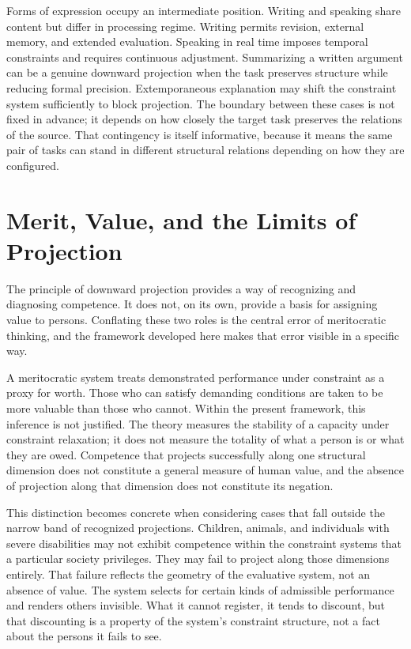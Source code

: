 \documentclass[12pt, a4paper]{article}
\begin{document}
Forms of expression occupy an intermediate position. Writing and speaking share content but differ in processing regime. Writing permits revision, external memory, and extended evaluation. Speaking in real time imposes temporal constraints and requires continuous adjustment. Summarizing a written argument can be a genuine downward projection when the task preserves structure while reducing formal precision. Extemporaneous explanation may shift the constraint system sufficiently to block projection. The boundary between these cases is not fixed in advance; it depends on how closely the target task preserves the relations of the source. That contingency is itself informative, because it means the same pair of tasks can stand in different structural relations depending on how they are configured.

\section{Merit, Value, and the Limits of Projection}

The principle of downward projection provides a way of recognizing and diagnosing competence. It does not, on its own, provide a basis for assigning value to persons. Conflating these two roles is the central error of meritocratic thinking, and the framework developed here makes that error visible in a specific way.

A meritocratic system treats demonstrated performance under constraint as a proxy for worth. Those who can satisfy demanding conditions are taken to be more valuable than those who cannot. Within the present framework, this inference is not justified. The theory measures the stability of a capacity under constraint relaxation; it does not measure the totality of what a person is or what they are owed. Competence that projects successfully along one structural dimension does not constitute a general measure of human value, and the absence of projection along that dimension does not constitute its negation.

This distinction becomes concrete when considering cases that fall outside the narrow band of recognized projections. Children, animals, and individuals with severe disabilities may not exhibit competence within the constraint systems that a particular society privileges. They may fail to project along those dimensions entirely. That failure reflects the geometry of the evaluative system, not an absence of value. The system selects for certain kinds of admissible performance and renders others invisible. What it cannot register, it tends to discount, but that discounting is a property of the system's constraint structure, not a fact about the persons it fails to see.
\end{document}
